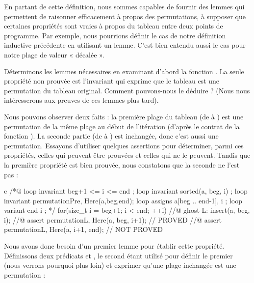En partant de cette définition, nous sommes capables de fournir des lemmes qui
permettent de raisonner efficacement à propos des permutations, à
supposer que certaines propriétés sont vraies à propos du tableau entre deux
points de programme. Par exemple, nous pourrions définir le cas 
de notre définition inductive précédente en utilisant un lemme. C'est bien
entendu aussi le cas pour notre plage de valeur « décalée ».



Déterminons les lemmes nécessaires en examinant d'abord la fonction
. La seule propriété non prouvée est l'invariant qui
exprime que le tableau est une permutation du tableau original. Comment
pouvons-nous le déduire ? (Nous nous intéresserons aux preuves de ces lemmes
plus tard).



Nous pouvons observer deux faits : la première plage du tableau (de
 à ) est une permutation de la même plage au
début de l'itération (d'après le contrat de la fonction ). La
seconde partie (de  à ) est inchangée, donc
c'est aussi une permutation. Essayons d'utiliser quelques assertions pour
déterminer, parmi ces propriétés, celles qui peuvent être prouvées et celles
qui ne le peuvent. Tandis que la première propriété est bien prouvée, nous
constatons que la seconde ne l'est pas :



\begin{CodeBlock}{c}
  /*@
    loop invariant beg+1 <= i <= end ;
    loop invariant sorted(a, beg, i) ;
    loop invariant permutation{Pre, Here}(a,beg,end);
    loop assigns a[beg .. end-1], i ;
    loop variant end-i ;
  */
  for(size_t i = beg+1; i < end; ++i) {
    //@ ghost L:
    insert(a, beg, i);
    //@ assert permutation{L, Here}(a, beg, i+1); // PROVED
    //@ assert permutation{L, Here}(a, i+1, end); // NOT PROVED
  }
\end{CodeBlock}


Nous avons donc besoin d'un premier lemme pour établir cette propriété.
Définissons deux prédicats  et ,
le second étant utilisé pour définir le premier (nous verrons pourquoi
plus loin) et exprimer qu'une plage inchangée est une permutation :





